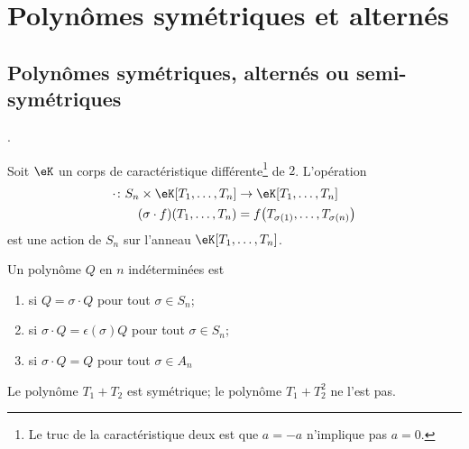 \section{Polynômes symétriques et alternés}

\subsection{Polynômes symétriques, alternés ou semi-symétriques}
\cite{fJhCTE}.

\begin{lemma}       \label{LEMooIRVQooHvoNBq}
    Soit \( \eK\) un corps de caractéristique différente\footnote{Le truc de la caractéristique deux est que $a=-a$ n'implique pas $a=0$.} de \(2\). L'opération
    \begin{equation}
        \begin{aligned}
            \cdot\colon S_n\times \eK[T_1,\ldots, T_n]&\to \eK[T_1,\ldots, T_n] \\
                (\sigma\cdot f)(T_1,\ldots, T_n)&=f\big( T_{\sigma(1)},\ldots, T_{\sigma(n)} \big)
        \end{aligned}
    \end{equation}
    est une action de \( S_n\) sur l'anneau  \( \eK[T_1,\ldots, T_n]\).
\end{lemma}

\begin{definition}
    Un polynôme \( Q\) en \( n\) indéterminées est
    \begin{enumerate}
        \item
             si \( Q=\sigma\cdot Q\) pour tout \( \sigma\in S_n\);
        \item
             si \( \sigma\cdot Q=\epsilon(\sigma)Q\) pour tout \( \sigma\in S_n\);
        \item
             si \( \sigma\cdot Q=Q\) pour tout \( \sigma\in A_n\)
    \end{enumerate}
\end{definition}
Le polynôme \( T_1+T_2\) est symétrique; le polynôme \( T_1+T_2^2\) ne l'est pas.

